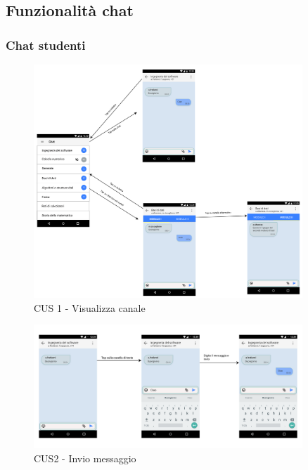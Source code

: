 \subsection{Funzionalità chat}

\subsubsection{Chat studenti}

\begin{figure}
	\centering
	\includegraphics[width=0.9\textwidth]{imgs/gruppo6/activities/act_cus1_visualizza_canale.pdf}
	\caption{CUS 1 - Visualizza canale}
	\label{fig:act-cus1}
\end{figure}

\begin{figure}
	\centering
	\includegraphics[width=0.9\textwidth]{imgs/gruppo6/activities/act_cus2_invio_messaggio.pdf}
	\caption{CUS2 - Invio messaggio}
	\label{fig:act-cus2}
\end{figure}

